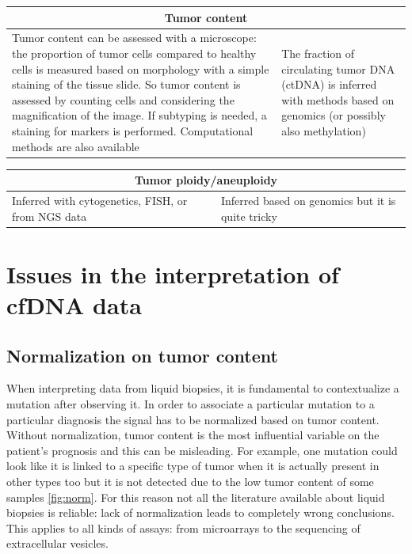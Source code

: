 \begin{tabular}{ | m{7cm}| m{7cm} | }
 \hline
 \multicolumn{2}{|c|}{Tumor content} \\
 \hline
 Tumor content can be assessed with a microscope: the proportion of tumor cells compared to healthy cells is measured based on morphology with a simple staining of the tissue slide. So tumor content is assessed by counting cells and considering the magnification of the image. If subtyping is needed, a staining for markers is performed. Computational methods are also available & The fraction of circulating tumor DNA (ctDNA) is inferred with methods based on genomics (or possibly also methylation) \\
 \hline
\end{tabular}

\begin{tabular}{ | m{7cm}| m{7cm} | }
 \hline
 \multicolumn{2}{|c|}{Tumor ploidy/aneuploidy } \\
 \hline
 Inferred with cytogenetics, FISH, or from NGS data & Inferred based on genomics but it is quite tricky \\
 \hline
 
\end{tabular}

\section{Issues in the interpretation of cfDNA data}

\subsection{Normalization on tumor content}
When interpreting data from liquid biopsies, it is fundamental to contextualize a mutation after observing it. In order to associate a particular mutation to a particular diagnosis the signal has to be normalized based on tumor content. Without normalization, tumor content is the most influential variable on the patient's prognosis and this can be misleading. For example, one mutation could look like it is linked to a specific type of tumor when it is actually present in other types too but it is not detected due to the low tumor content of some samples \ref{fig:norm}. For this reason not all the literature available about liquid biopsies is reliable: lack of normalization leads to completely wrong conclusions. This applies to all kinds of assays: from microarrays to the sequencing of extracellular vesicles. \\

